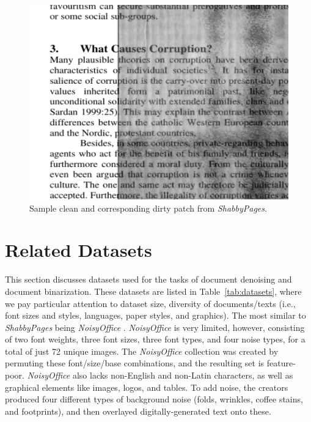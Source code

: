 \documentclass[runningheads]{llncs}
\begin{document}
\begin{figure}
\centering
\includegraphics[width=0.98\columnwidth]{figures/what_causes_corruption.png}
\caption{Sample clean and corresponding dirty patch from \emph{ShabbyPages}.} \label{fig1}
\end{figure}

\section{Related Datasets}
This section discusses datasets used for the tasks of document denoising and document binarization.
These datasets are listed in Table~\ref{tab:datasets}, where we pay particular attention to dataset size, diversity of documents/texts (i.e., font sizes and styles, languages, paper styles, and graphics).
The most similar to \emph{ShabbyPages} being \emph{NoisyOffice} \cite{ref_NoisyOfficeDatabase}.
\emph{NoisyOffice} is very limited, however, consisting of two font weights, three font sizes, three font types, and four noise types, for a total of just 72 unique images.
The \emph{NoisyOffice} collection was created by permuting these font/size/base combinations, and the resulting set is feature-poor.
\emph{NoisyOffice} also lacks non-English and non-Latin characters, as well as graphical elements like images, logos, and tables.
To add noise, the creators produced four different types of background noise (folds, wrinkles, coffee stains, and footprints), and then overlayed digitally-generated text onto these.
\end{document}
